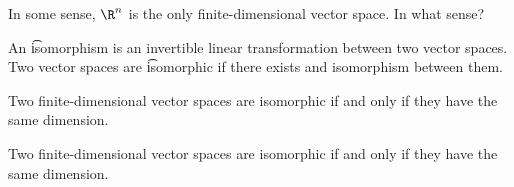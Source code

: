 

In some sense, $\R^n$ is the only finite-dimensional vector space.
In what sense?


An \t{isomorphism} is an invertible linear transformation between two vector spaces.
Two vector spaces are \t{isomorphic} if there exists and isomorphism between them.


\begin{prop}
  Two finite-dimensional vector spaces are isomorphic if and only if they have the same dimension.
\end{prop}

\begin{corr}
  Two finite-dimensional vector spaces are isomorphic if and only if they have the same dimension.
\end{corr}
